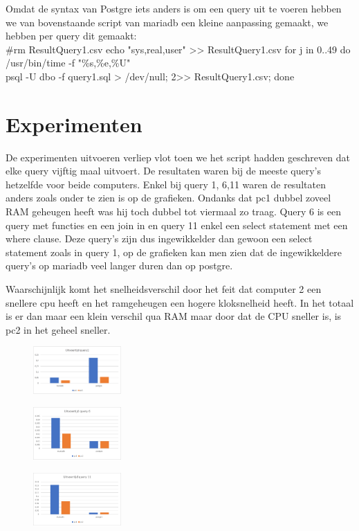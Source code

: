 \documentclass[fleqn,10pt]{artikeltin}
\begin{document}
Omdat de syntax van Postgre iets anders is om een query uit te voeren hebben we van bovenstaande script van mariadb een kleine aanpassing gemaakt, we hebben per query dit gemaakt: \\
 \#rm ResultQuery1.csv
echo "sys,real,user" >> ResultQuery1.csv
for j in {0..49}
do
{ /usr/bin/time -f "\%s,\%e,\%U" \\
 psql -U dbo -f query1.sql > /dev/null; } 2>> ResultQuery1.csv;
done 


\section{Experimenten}
\label{sec:experimenten}

De experimenten uitvoeren verliep vlot toen we het script hadden geschreven dat elke query vijftig maal uitvoert. De resultaten waren bij de meeste query's hetzelfde voor beide computers. Enkel bij query 1, 6,11 waren de resultaten anders zoals onder te zien is op de grafieken. Ondanks dat pc1 dubbel zoveel RAM geheugen heeft was hij toch dubbel tot viermaal zo traag. Query 6 is een query met functies en een join in en query 11 enkel een select statement met een where clause. Deze query's zijn dus ingewikkelder dan gewoon een select statement zoals in query 1, op de grafieken kan men zien dat de ingewikkeldere query's op mariadb veel langer duren dan op postgre. 

Waarschijnlijk komt het snelheidsverschil door het feit dat computer 2 een snellere cpu heeft en het ramgeheugen een hogere kloksnelheid heeft. In het totaal is er dan maar een klein verschil qua RAM maar door dat de CPU sneller is, is pc2 in het geheel sneller. 

\begin{figure}[ht]
    \includegraphics[width=0.30\textwidth]{query1.png}
   
\end{figure}
\begin{figure}[ht]
     \includegraphics[width=0.30\textwidth]{query6Graph.png} 
\end{figure}
\begin{figure}[ht]
     \includegraphics[width=0.30\textwidth]{query11Graph.png}
\end{figure}
\end{document}
